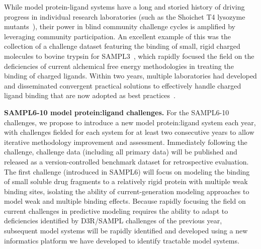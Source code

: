 \documentclass[11pt]{article}
\begin{document}
While model protein-ligand systems have a long and storied history of driving progress in individual research laboratories (such as the Shoichet T4 lysozyme mutants~\cite{shoichet}), their power in blind community challenge cycles is amplified by leveraging community participation.
An excellent example of this was the collection of a challenge dataset featuring the binding of small, rigid charged molecules to bovine trypsin for SAMPL3~\cite{Newman:2011:JComputAidedMolDes}, which rapidly focused the field on the deficiencies of current alchemical free energy methodologies in treating the binding of charged ligands.
Within two years, multiple laboratories had developed and disseminated convergent practical solutions to effectively handle charged ligand binding that are now adopted as best practices~\cite{Rocklin:2013:TheJournalofChemicalPhysicsb,Reif:2014:JournalofComputationalChemistrya}.

{\bf SAMPL6-10 model protein:ligand challenges.} For the SAMPL6-10 challenges, we propose to introduce a new model protein:ligand system each year, with challenges fielded for each system for at least two consecutive years to allow iterative methodology improvement and assessment.
Immediately following the challenge, challenge data (including all primary data) will be published and released as a version-controlled benchmark dataset for retrospective evaluation.
The first challenge (introduced in SAMPL6) will focus on modeling the binding of small soluble drug fragments to a relatively rigid protein with multiple weak binding sites, isolating the ability of current-generation modeling approaches to model weak and multiple binding effects.
Because rapidly focusing the field on current challenges in predictive modeling requires the ability to adapt to deficiencies identified by D3R/SAMPL challenges of the previous year, subsequent model systems will be rapidly identified and developed using a new informatics platform we have developed to identify tractable model systems.
\end{document}
